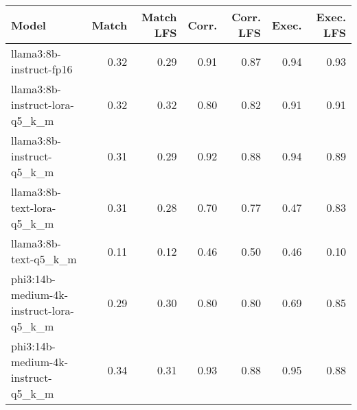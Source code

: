 \begin{tabular}{lrrrrrr}
\toprule
Model & Match & Match LFS & Corr. & Corr. LFS & Exec. & Exec. LFS \\
\midrule
llama3:8b-instruct-fp16 & 0.32 & 0.29 & 0.91 & 0.87 & 0.94 & 0.93 \\
llama3:8b-instruct-lora-q5\_k\_m & 0.32 & 0.32 & 0.80 & 0.82 & 0.91 & 0.91 \\
llama3:8b-instruct-q5\_k\_m & 0.31 & 0.29 & 0.92 & 0.88 & 0.94 & 0.89 \\
llama3:8b-text-lora-q5\_k\_m & 0.31 & 0.28 & 0.70 & 0.77 & 0.47 & 0.83 \\
llama3:8b-text-q5\_k\_m & 0.11 & 0.12 & 0.46 & 0.50 & 0.46 & 0.10 \\
phi3:14b-medium-4k-instruct-lora-q5\_k\_m & 0.29 & 0.30 & 0.80 & 0.80 & 0.69 & 0.85 \\
phi3:14b-medium-4k-instruct-q5\_k\_m & 0.34 & 0.31 & 0.93 & 0.88 & 0.95 & 0.88 \\
\bottomrule
\end{tabular}
